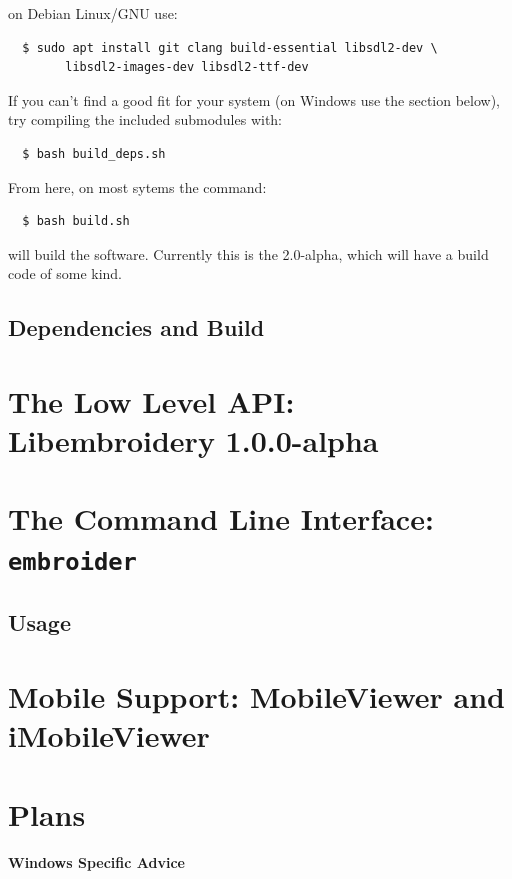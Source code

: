 \documentclass[a4paper, 11pt]{report}
\newcommand{\libembversion}{1.0.0-alpha}
\begin{document}
on Debian Linux/GNU use:

\begin{verbatim}
  $ sudo apt install git clang build-essential libsdl2-dev \
        libsdl2-images-dev libsdl2-ttf-dev
\end{verbatim}

If you can't find a good fit for your system (on Windows use the section below),
try compiling the included submodules with:

\begin{verbatim}
  $ bash build_deps.sh
\end{verbatim}

From here, on most sytems the command:

\begin{verbatim}
  $ bash build.sh
\end{verbatim}

will build the software. Currently this is the 2.0-alpha, which will have a build code of
some kind.

\section{Dependencies and Build}

\chapter{The Low Level API: Libembroidery \libembversion}

\chapter{The Command Line Interface: \texttt{embroider}}

\section{Usage}

\chapter{Mobile Support: MobileViewer and iMobileViewer}

\chapter{Plans}

\subsubsection{Windows Specific Advice}
\end{document}
